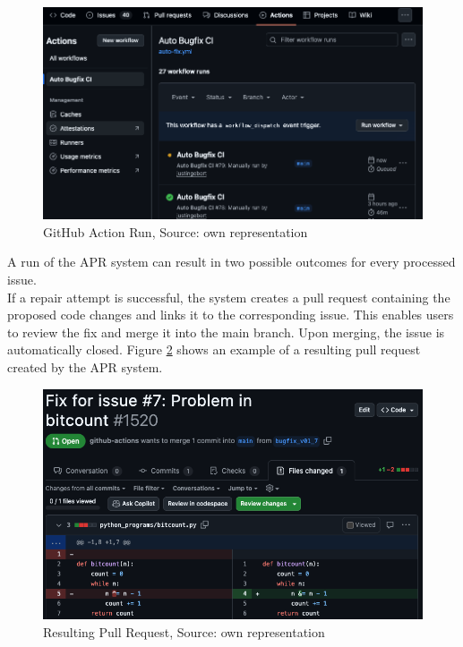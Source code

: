 \begin{figure}[H]
    \centering
    \includegraphics[width=1\textwidth]{images/workflow/new_run.png}
    \caption{GitHub Action Run, Source: own representation}
    \label{fig:apr-action}
\end{figure}

A run of the APR system can result in two possible outcomes for every processed issue. \\
If a repair attempt is successful, the system creates a pull request containing the proposed code changes and links it to the corresponding issue. This enables users to review the fix and merge it into the main branch. Upon merging, the issue is automatically closed.
Figure \ref{fig:pr} shows an example of a resulting pull request created by the APR system.

\begin{figure}[H]
    \centering
    \includegraphics[width=1\textwidth]{images/workflow/pr.png}
    \caption{Resulting Pull Request, Source: own representation}
    \label{fig:pr}
\end{figure}

